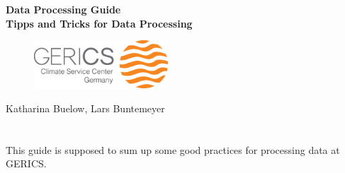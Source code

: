 \documentclass[12pt]{article}              %
\begin{document}

\titlepage
\vspace*{2cm}
\begin{center}
\textbf{\huge{Data Processing Guide}}\\
\vspace*{1cm}
\vspace{1cm}
\textbf{\Large Tipps and Tricks for Data Processing } \\
\vspace*{4cm}
\begin{figure} [h!tb]
\begin{center}
\includegraphics[width=5cm, natwidth=200, natheight=195]{./fig/Logo_GERICS_final.eps} \\
\end{center}
\end{figure}
\normalsize
\vspace*{5cm} 
{\Large{Katharina Buelow, Lars Buntemeyer}}\\
\Large
\vspace*{2cm}
\normalsize
\end{center}


\chapter*{}

This guide is supposed to sum up some good practices for processing data at GERICS. 

\setcounter{page}{2}                    %

\tableofcontents                        %




 
 
%
%
\appendix
%
%


\end{document}
